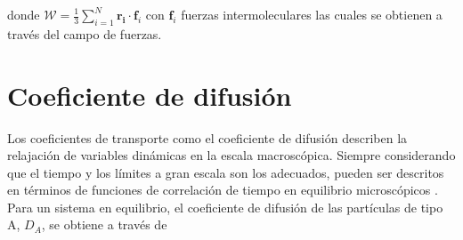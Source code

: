 \noindent donde $\mathcal{W} = \frac{1}{3} \sum_{i=1}^N \mathbf{r_i} \cdot \mathbf{f}_i$ con $\mathbf{f}_i$ fuerzas intermoleculares las cuales se obtienen a través del campo de fuerzas.

\section{Coeficiente de difusión}









Los coeficientes de transporte como el coeficiente de difusión describen la relajación de variables dinámicas en la escala macroscópica. Siempre considerando que el tiempo y los límites a gran escala son los adecuados, pueden ser descritos en términos de funciones de correlación de tiempo en equilibrio microscópicos \cite{Allen2017}. Para un sistema en equilibrio, el coeficiente de difusión de las partículas de tipo A, $D_A$, se obtiene a través de \cite{gromacsdoc}

